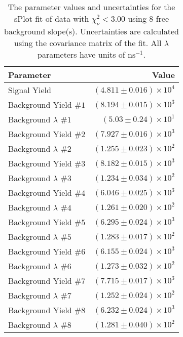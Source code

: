 
\begin{table}
    \begin{center}
        \begin{tabular}{lr}\toprule
            Parameter & Value \\\midrule
            Signal Yield & $(4.811 \pm 0.016) \times 10^{4}$ \\
            Background Yield $\#1$ & $(8.194 \pm 0.015) \times 10^{3}$ \\
            Background $\lambda$ $\#1$ & $(5.03 \pm 0.24) \times 10^{1}$ \\
            Background Yield $\#2$ & $(7.927 \pm 0.016) \times 10^{3}$ \\
            Background $\lambda$ $\#2$ & $(1.255 \pm 0.023) \times 10^{2}$ \\
            Background Yield $\#3$ & $(8.182 \pm 0.015) \times 10^{3}$ \\
            Background $\lambda$ $\#3$ & $(1.234 \pm 0.034) \times 10^{2}$ \\
            Background Yield $\#4$ & $(6.046 \pm 0.025) \times 10^{3}$ \\
            Background $\lambda$ $\#4$ & $(1.261 \pm 0.020) \times 10^{2}$ \\
            Background Yield $\#5$ & $(6.295 \pm 0.024) \times 10^{3}$ \\
            Background $\lambda$ $\#5$ & $(1.283 \pm 0.017) \times 10^{2}$ \\
            Background Yield $\#6$ & $(6.155 \pm 0.024) \times 10^{3}$ \\
            Background $\lambda$ $\#6$ & $(1.273 \pm 0.032) \times 10^{2}$ \\
            Background Yield $\#7$ & $(7.715 \pm 0.017) \times 10^{3}$ \\
            Background $\lambda$ $\#7$ & $(1.252 \pm 0.024) \times 10^{2}$ \\
            Background Yield $\#8$ & $(6.232 \pm 0.024) \times 10^{3}$ \\
            Background $\lambda$ $\#8$ & $(1.281 \pm 0.040) \times 10^{2}$ \\\bottomrule
        \end{tabular}
        \caption{The parameter values and uncertainties for the sPlot fit of data with $\chi^2_\nu < 3.00$ using 8 free background slope(s). Uncertainties are calculated using the covariance matrix of the fit. All $\lambda$ parameters have units of $\si{\nano\second}^{-1}$.}
    \end{center}
\end{table}
